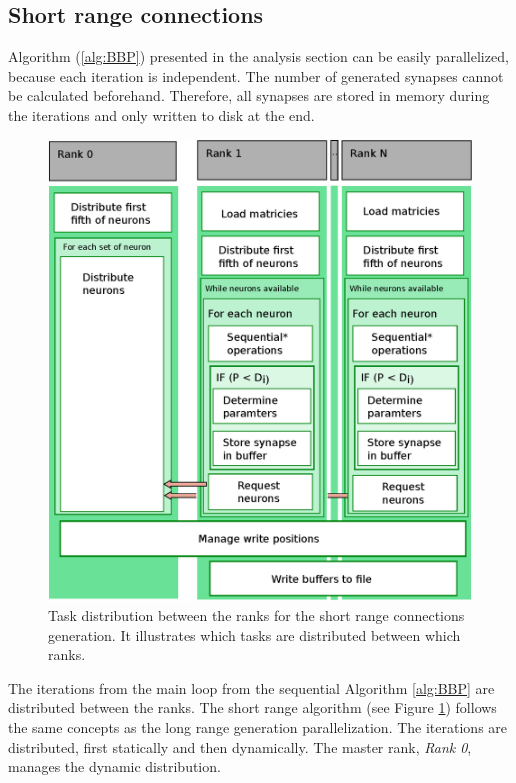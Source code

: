 \subsection{Short range connections}
Algorithm (\ref{alg:BBP}) presented in the analysis section can be easily parallelized,
because each iteration is independent.
The number of generated synapses cannot be calculated beforehand.
Therefore, all synapses are stored in memory during the iterations and only written to disk 
at the end.
\begin{figure}[ht!]
\centering
\includegraphics[scale=0.5]{pictures/shortRange_parallelAlg.eps}
\caption[Task distribution between the ranks for the short range connections generation]{Task distribution between the ranks for the short range connections generation.
It illustrates which tasks are distributed between which ranks.}
\label{fig:shortrangeparallel}
\end{figure}
The iterations from the main loop from the sequential Algorithm \ref{alg:BBP} are distributed between the ranks.
The short range algorithm (see Figure \ref{fig:shortrangeparallel}) follows the same concepts as the long range generation parallelization.
The iterations are distributed, first statically and then dynamically.
The master rank, \emph{Rank 0}, manages the dynamic distribution.
